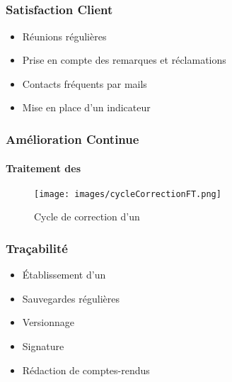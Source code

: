 \speaker{\Pierre}

\subsection{} %

\begin{frame}
\frametitle{Satisfaction Client}
	\begin{itemize}
		\item Réunions régulières
		\item Prise en compte des remarques et réclamations
		\item Contacts fréquents par mails
		\item Mise en place d'un indicateur
	\end{itemize}
\end{frame}

\begin{frame}
\frametitle{Amélioration Continue}
\framesubtitle{Traitement des \FT{}}
\begin{center}
\begin{figure}
\texttt{[image: images/cycleCorrectionFT.png]}
\caption{Cycle de correction d'un \FT{}}
\end{figure}
\end{center}
\end{frame}


\begin{frame}
\frametitle{Traçabilité}
	\begin{itemize}
		\item Établissement d'un \PGC{}
		\item Sauvegardes régulières
		\item Versionnage
		\item Signature
		\item Rédaction de comptes-rendus
	\end{itemize}
\end{frame}